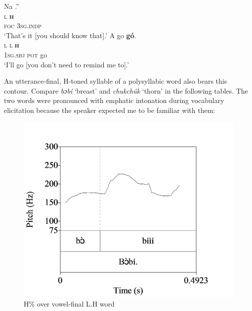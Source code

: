 \ea\label{ex:key:84}
\glll Na  .''\\
\textsc{l}  \textbf{\textsc{h}}\\
\textsc{foc}  \textsc{3sg.indp}\\
\glt   ‘That’s it [you should know that].’
\z
\ea\label{ex:key:85}
\glll    A    go  \textbf{gó}.  \\
\textsc{l}    \textsc{l}  \textbf{\textsc{h}}\\
\textsc{1sg.sbj}  \textsc{pot}  go\\
\glt   ‘I’ll go [you don’t need to remind me to].’ 
\z

An utterance-final, H-toned syllable of a polysyllabic word also bears this contour. Compare \textit{bɔbí} ‘breast’ and \textit{chukchúk} ‘thorn’ in the following tables. The two words were pronounced with emphatic intonation during vocabulary elicitation because the speaker expected me to be familiar with them: 

\begin{figure}
\caption{H\% over vowel-final L.H word}
\label{fig:key:3.33}
\includegraphics[height=.3\textheight]{figures/yakpomod-img35.png}
\end{figure}



